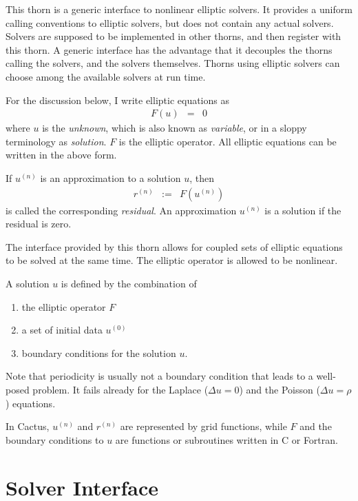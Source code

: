 This thorn is a generic interface to nonlinear elliptic solvers.  It
provides a uniform calling conventions to elliptic solvers, but does
not contain any actual solvers.  Solvers are supposed to be
implemented in other thorns, and then register with this thorn.  A
generic interface has the advantage that it decouples the thorns
calling the solvers, and the solvers themselves.  Thorns using
elliptic solvers can choose among the available solvers at run time.

For the discussion below, I write elliptic equations as
%
\begin{eqnarray}
   F(u) & = & 0
\end{eqnarray}
%
where $u$ is the \emph{unknown}, which is also known as
\emph{variable}, or in a sloppy terminology as \emph{solution}.  $F$
is the elliptic operator.  All elliptic equations can be written in
the above form.

If $u^{(n)}$ is an approximation to a solution $u$, then
%
\begin{eqnarray}
   r^{(n)} & := & F(u^{(n)})
\end{eqnarray}
%
is called the corresponding \emph{residual}.  An approximation
$u^{(n)}$ is a solution if the residual is zero.

The interface provided by this thorn allows for coupled sets of
elliptic equations to be solved at the same time.  The elliptic
operator is allowed to be nonlinear.

A solution $u$ is defined by the combination of
%
\begin{enumerate}
\item the elliptic operator $F$
\item a set of initial data $u^{(0)}$
\item boundary conditions for the solution $u$.
\end{enumerate}

Note that periodicity is usually not a boundary condition that leads
to a well-posed problem.  It fails already for the Laplace ($\Delta u
= 0$) and the Poisson ($\Delta u = \rho$) equations.

In Cactus, $u^{(n)}$ and $r^{(n)}$ are represented by grid functions,
while $F$ and the boundary conditions to $u$ are functions or
subroutines written in C or Fortran.



\section{Solver Interface}

